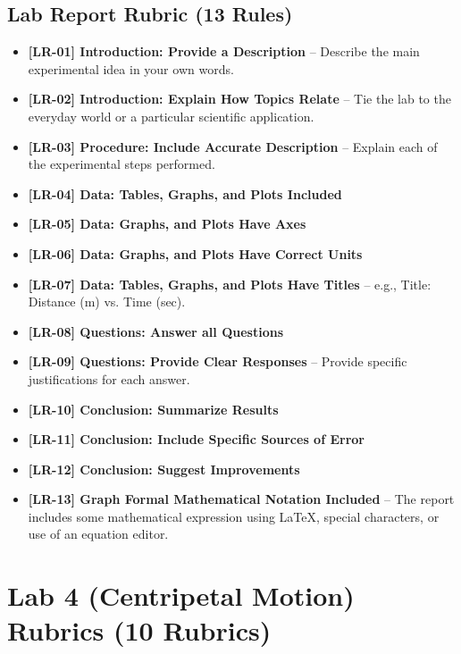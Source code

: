 \documentclass{article}
\begin{document}
\subsection*{Lab Report Rubric (13 Rules)}
\begin{itemize}
\item \textbf{ [LR-01] Introduction: Provide a Description } –  Describe the main experimental idea in your own words.
\item \textbf{ [LR-02] Introduction:  Explain How Topics Relate } – Tie the lab to the everyday world or a particular scientific application.
\item \textbf{ [LR-03] Procedure: Include Accurate Description } – Explain each of the experimental steps performed.
\item \textbf{ [LR-04] Data: Tables, Graphs, and Plots Included }
\item \textbf{ [LR-05] Data:  Graphs, and Plots Have Axes }
\item \textbf{ [LR-06] Data: Graphs, and Plots Have Correct Units }
\item \textbf{ [LR-07] Data: Tables, Graphs, and Plots Have Titles } – e.g., Title: Distance (m) vs. Time (sec).
\item \textbf{ [LR-08] Questions:  Answer all Questions } 
\item \textbf{ [LR-09] Questions:  Provide Clear Responses } – Provide specific justifications for each answer.
\item \textbf{ [LR-10] Conclusion:  Summarize Results }
\item \textbf{ [LR-11] Conclusion:  Include Specific Sources of Error }
\item \textbf{ [LR-12] Conclusion:  Suggest Improvements }
\item \textbf{ [LR-13] Graph Formal Mathematical Notation Included } –  The report includes some mathematical expression using LaTeX, special characters, or use of an equation editor. 
\end{itemize}

\section*{Lab 4 (Centripetal Motion) Rubrics (10 Rubrics)}
\end{document}
